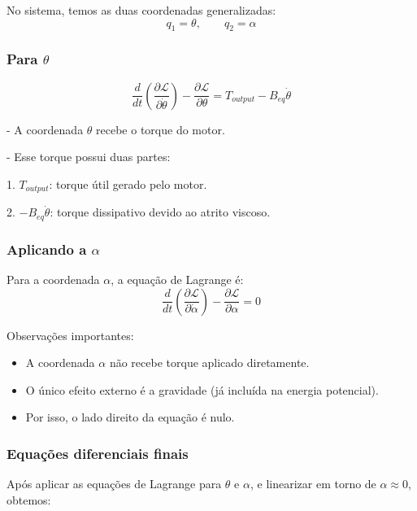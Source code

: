 \documentclass[9pt,a4paper,twocolumn,twoside]{tau-class/tau}
\begin{document}
No sistema, temos as duas coordenadas generalizadas:
\[
q_1 = \theta, \qquad q_2 = \alpha
\]



\subsubsection*{Para $\theta$}
\begin{equation}
    \frac{d}{dt}\left(\frac{\partial \mathcal{L}}{\partial \dot{\theta}}\right)
    - \frac{\partial \mathcal{L}}{\partial \theta}
    = T_{output} - B_{eq}\dot{\theta}
\end{equation}

- A coordenada $\theta$ recebe o torque do motor. 

- Esse torque possui duas partes:

    1. $T_{output}$: torque útil gerado pelo motor.  

    2. $-B_{eq}\dot{\theta}$: torque dissipativo devido ao atrito viscoso.  



\subsubsection*{Aplicando a $\alpha$}

Para a coordenada $\alpha$, a equação de Lagrange é:
\begin{equation}
    \frac{d}{dt}\left(\frac{\partial \mathcal{L}}{\partial \dot{\alpha}}\right)
    - \frac{\partial \mathcal{L}}{\partial \alpha} = 0
\end{equation}

\noindent
Observações importantes:
\begin{itemize}
    \item A coordenada $\alpha$ não recebe torque aplicado diretamente.
    \item O único efeito externo é a gravidade (já incluída na energia potencial).
    \item Por isso, o lado direito da equação é nulo.
\end{itemize}



\subsubsection*{Equações diferenciais finais}

Após aplicar as equações de Lagrange para $\theta$ e $\alpha$, e linearizar em torno de $\alpha \approx 0$, obtemos:
\end{document}
